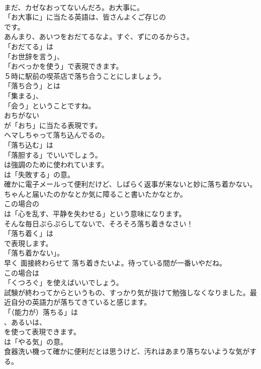\documentclass[8pt]{extreport}
\begin{document}
\begin{CJK}{UTF8}{min}
\\	まだ、カゼなおってないんだろ。お大事に。 
\\	「お大事に」に当たる英語は、皆さんよくご存じの
\\	です。	
\\	あんまり、あいつをおだてるなよ。すぐ、ずにのるからさ。 
\\	「おだてる」は
\\	「お世辞を言う」、
\\	「おべっかを使う」で表現できます。	
\\	５時に駅前の喫茶店で落ち合うことにしましょう。 
\\	「落ち合う」とは
\\	「集まる」、
\\	「会う」ということですね。	
\\	おちがない 
\\	が「おち」に当たる表現です。	
\\	ヘマしちゃって落ち込んでるの。 
\\	「落ち込む」は
\\	「落胆する」でいいでしょう。
\\	は強調のために使われています。
\\	は「失敗する」の意。	
\\	確かに電子メールって便利だけど、しばらく返事が来ないと妙に落ち着かない。ちゃんと届いたのかなとか気に障ること書いたかなとか。 
\\	この場合の
\\	は「心を乱す、平静を失わせる」という意味になります。	
\\	そんな毎日ぷらぷらしてないで、そろそろ落ち着きなさい！ 
\\	「落ち着く」は
\\	で表現します。
\\	「落ち着かない」。	
\\	早く 面接終わらせて 落ち着きたいよ。待っている間が一番いやだね。 
\\	この場合は
\\	「くつろぐ」を使えばいいでしょう。	
\\	試験が終わってからというもの、すっかり気が抜けて勉強しなくなりました。最近自分の英語力が落ちてきていると感じます。 
\\	「（能力が）落ちる」は 
\\	、あるいは、
\\	を使って表現できます。
\\	は「やる気」の意。	
\\	食器洗い機って確かに便利だとは思うけど、汚れはあまり落ちないような気がする。 

\end{CJK}
\end{document}
